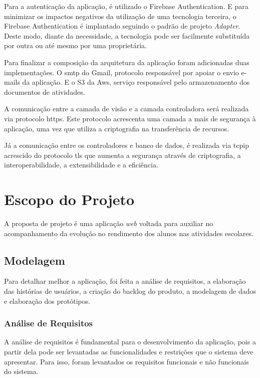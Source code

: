 \documentclass[
    12pt,               %
    openright,          %
    oneside,
    a4paper,            %
    english,            %
    brazil              %
    ]{ifsp-spo-inf-ctds} %
\begin{document}
Para a autenticação da aplicação, é utilizado o Firebase Authentication. E para minimizar os impactos negativos da utilização de uma tecnologia terceira, o Firebase Authentication é implantado seguindo o padrão de projeto \textit{Adapter}. Deste modo, diante da necessidade, a tecnologia pode ser facilmente substituída por outra ou até mesmo por uma proprietária.

Para finalizar a composição da arquitetura da aplicação foram adicionadas duas implementações. O \ac{smtp} do Gmail, protocolo responsável por apoiar o envio e-mails da aplicação. E o S3 da Aws, serviço responsável pelo armazenamento dos documentos de atividades.


A comunicação entre a camada de visão e a camada controladora será realizada via protocolo \ac{https}. Este protocolo acrescenta uma camada a mais de segurança à aplicação, uma vez que utiliza a criptografia na transferência de recursos.


Já a comunicação entre os controladores e banco de dados, é realizada via \ac{tcpip} acrescido do protocolo \ac{tls} que aumenta a segurança através de criptografia, a interoperabilidade, a extensibilidade e a eficiência.

\section{Escopo do Projeto}
A proposta de projeto é uma aplicação \textit{web} voltada para auxiliar no acompanhamento da evolução no rendimento dos alunos nas atividades escolares.

\subsection{Modelagem}
Para detalhar melhor a aplicação, foi feita a análise de requisitos, a elaboração das histórias de usuários, a criação do backlog do produto, a modelagem de dados e elaboração dos protótipos.

\subsubsection{Análise de Requisitos}
A análise de requisitos é fundamental para o desenvolvimento da aplicação, pois a partir dela pode ser levantadas as funcionalidades e restrições que o sistema deve apresentar. Para isso, foram levantados os requisitos funcionais e não funcionais do sistema.
\end{document}
